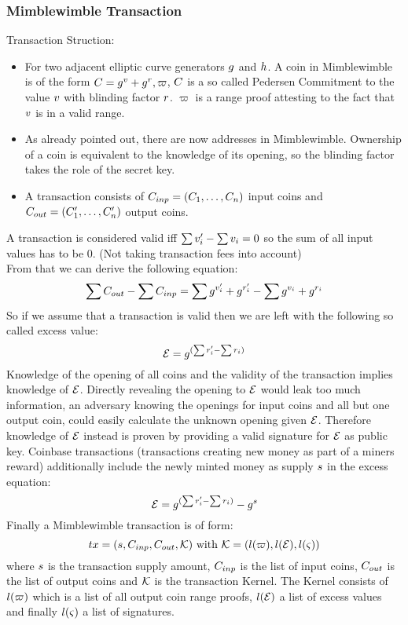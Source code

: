 \subsubsection{Mimblewimble Transaction}
Transaction Struction:
\begin{itemize}
    \item For two adjacent elliptic curve generators $g$ and $h$. A coin in Mimblewimble is of the form $C = g^{v} + g^{r}, \varpi$, $C$ is a so called Pedersen Commitment
    to the value $v$ with blinding factor $r$. $\varpi$ is a range proof attesting to the fact that $v$ is in a valid range.
    \item As already pointed out, there are now addresses in Mimblewimble. Ownership of a coin is equivalent to the knowledge of its opening, so the blinding factor takes the role of the secret key.
    \item A transaction consists of $C_{inp} = (C_1, \dots, C_n)$ input coins and $C_{out} = (C'_1, \dots, C'_n)$ output coins.
\end{itemize}
A transaction is considered valid iff $\sum{v'_i} - \sum{v_i} = 0$ so the sum of all input values has to be 0. (Not taking transaction fees into account)\\
From that we can derive the following equation:
\[ \sum{C_{out}} - \sum{C_{inp}} = \sum{g^{v'_i} + g^{r'_i}} - \sum{g^{v_i} + g^{r_i}} \]
So if we assume that a transaction is valid then we are left with the following so called excess value:
\[ \mathcal{E} = g^{(\sum{r'_i} - \sum{r_i})} \]
Knowledge of the opening of all coins and the validity of the transaction implies knowledge of $\mathcal{E}$.
Directly revealing the opening to $\mathcal{E}$ would leak too much information, an adversary knowing the openings for input coins and all but one output coin, could easily calculate the unknown opening given $\mathcal{E}$.
Therefore knowledge of $\mathcal{E}$ instead is proven by providing a valid signature for $\mathcal{E}$ as public key.
Coinbase transactions (transactions creating new money as part of a miners reward) additionally include the newly minted money as supply $s$ in the excess equation:
\[ \mathcal{E} = g^{(\sum{r'_i} - \sum{r_i})} - g^{s} \]
Finally a Mimblewimble transaction is of form:
\[ tx = (s, C_{inp}, C_{out}, \mathcal{K})~\text{with}~\mathcal{K} = (l(\varpi), l(\mathcal{E}), l(\varsigma)) \]
where $s$ is the transaction supply amount, $C_{inp}$ is the list of input coins, $C_{out}$ is the list of output coins and $\mathcal{K}$ is the transaction Kernel. The Kernel consists of $l(\varpi)$
which is a list of all output coin range proofs, $l(\mathcal{E})$ a list of excess values and finally $l(\varsigma)$ a list of signatures.

